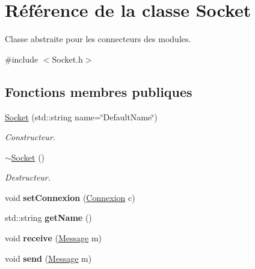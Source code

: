 \hypertarget{classSocket}{\section{Référence de la classe Socket}
\label{classSocket}
}


Classe abstraite pour les connecteurs des modules.  




{\ttfamily \#include $<$Socket.\-h$>$}

\subsection*{Fonctions membres publiques}
\begin{DoxyCompactItemize}
\item 
\hypertarget{classSocket_a04302e4ac7ddb995c766de9078cd848c}{\hyperlink{classSocket_a04302e4ac7ddb995c766de9078cd848c}{Socket} (std\-::string name=\char`\"{}Default\-Name\char`\"{})}\label{classSocket_a04302e4ac7ddb995c766de9078cd848c}

\begin{DoxyCompactList}\small\item\em Constructeur. \end{DoxyCompactList}\item 
\hypertarget{classSocket_aeac4eb6379a543d38ed88977d3b6630a}{\hyperlink{classSocket_aeac4eb6379a543d38ed88977d3b6630a}{$\sim$\-Socket} ()}\label{classSocket_aeac4eb6379a543d38ed88977d3b6630a}

\begin{DoxyCompactList}\small\item\em Destructeur. \end{DoxyCompactList}\item 
\hypertarget{classSocket_af59c7f08d2a170ec9b15bce6fd62f865}{void {\bfseries set\-Connexion} (\hyperlink{classConnexion}{Connexion} c)}\label{classSocket_af59c7f08d2a170ec9b15bce6fd62f865}

\item 
\hypertarget{classSocket_aaefa10006cbf7a7a082e4adc606b3cea}{std\-::string {\bfseries get\-Name} ()}\label{classSocket_aaefa10006cbf7a7a082e4adc606b3cea}

\item 
\hypertarget{classSocket_af137eda5415e1bd9aa6dd6467eb0d97d}{void {\bfseries receive} (\hyperlink{classMessage}{Message} m)}\label{classSocket_af137eda5415e1bd9aa6dd6467eb0d97d}

\item 
\hypertarget{classSocket_af7fb88a308724635a3ca3ed040b87b1a}{void {\bfseries send} (\hyperlink{classMessage}{Message} m)}\label{classSocket_af7fb88a308724635a3ca3ed040b87b1a}


\end{DoxyCompactItemize}
